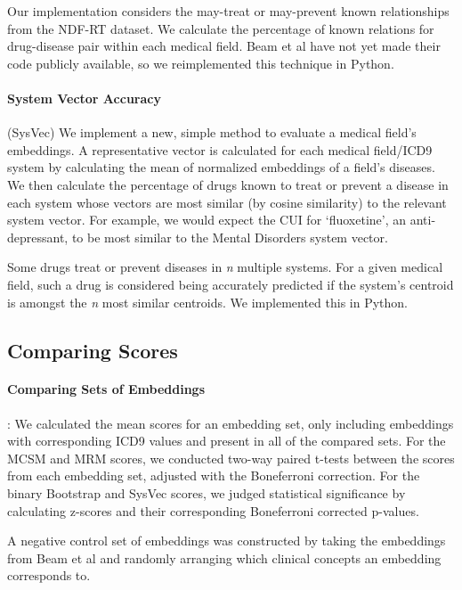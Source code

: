 \documentclass[11pt,a4paper]{article}
\begin{document}
Our implementation considers the may-treat or may-prevent known relationships from the NDF-RT dataset. We calculate the percentage of known relations for drug-disease pair within each medical field. Beam et al have not yet made their code publicly available, so we reimplemented this technique in Python. 

\paragraph{System Vector Accuracy}(SysVec)
We implement a new, simple method to evaluate a medical field's embeddings. A representative vector is calculated for each medical field/ICD9 system by calculating the mean of normalized embeddings of a field's diseases. We then calculate the percentage of drugs known to treat or prevent a disease in each system whose vectors are most similar (by cosine similarity) to the relevant system vector. For example, we would expect the CUI for `fluoxetine', an anti-depressant, to be most similar to the Mental Disorders system vector. 

Some drugs treat or prevent diseases in \emph{n} multiple systems. For a given medical field, such a drug is considered being accurately predicted if the system's centroid is amongst the \emph{n} most similar centroids. We implemented this in Python. 

\subsection{Comparing Scores}

\paragraph{Comparing Sets of Embeddings}: We calculated the mean scores for an embedding set, only including embeddings with corresponding ICD9 values and present in all of the compared sets. For the MCSM and MRM scores, we conducted two-way paired t-tests between the scores from each embedding set, adjusted with the Boneferroni correction. For the binary Bootstrap and SysVec scores, we judged statistical significance by calculating z-scores and their corresponding Boneferroni corrected p-values. 

A negative control set of embeddings was constructed by taking the embeddings from Beam et al  and randomly arranging which clinical concepts an embedding corresponds to. 
\end{document}
